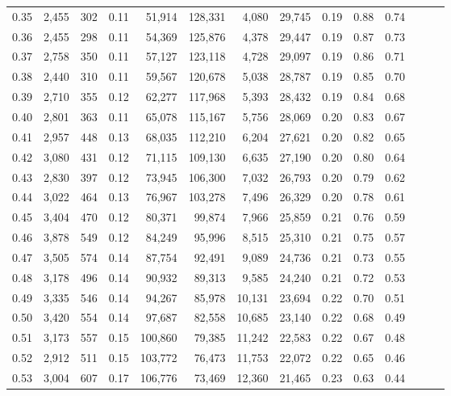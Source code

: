 \begin{tabular}{rrrrrrrrrrrrrr}
0.35 &  2,455 &  302 &  0.11 &   51,914 &  128,331 &   4,080 &  29,745 &  0.19 &  0.88 &      0.74 \\
0.36 &  2,455 &  298 &  0.11 &   54,369 &  125,876 &   4,378 &  29,447 &  0.19 &  0.87 &      0.73 \\
0.37 &  2,758 &  350 &  0.11 &   57,127 &  123,118 &   4,728 &  29,097 &  0.19 &  0.86 &      0.71 \\
0.38 &  2,440 &  310 &  0.11 &   59,567 &  120,678 &   5,038 &  28,787 &  0.19 &  0.85 &      0.70 \\
0.39 &  2,710 &  355 &  0.12 &   62,277 &  117,968 &   5,393 &  28,432 &  0.19 &  0.84 &      0.68 \\
0.40 &  2,801 &  363 &  0.11 &   65,078 &  115,167 &   5,756 &  28,069 &  0.20 &  0.83 &      0.67 \\
0.41 &  2,957 &  448 &  0.13 &   68,035 &  112,210 &   6,204 &  27,621 &  0.20 &  0.82 &      0.65 \\
0.42 &  3,080 &  431 &  0.12 &   71,115 &  109,130 &   6,635 &  27,190 &  0.20 &  0.80 &      0.64 \\
0.43 &  2,830 &  397 &  0.12 &   73,945 &  106,300 &   7,032 &  26,793 &  0.20 &  0.79 &      0.62 \\
0.44 &  3,022 &  464 &  0.13 &   76,967 &  103,278 &   7,496 &  26,329 &  0.20 &  0.78 &      0.61 \\
0.45 &  3,404 &  470 &  0.12 &   80,371 &   99,874 &   7,966 &  25,859 &  0.21 &  0.76 &      0.59 \\
0.46 &  3,878 &  549 &  0.12 &   84,249 &   95,996 &   8,515 &  25,310 &  0.21 &  0.75 &      0.57 \\
0.47 &  3,505 &  574 &  0.14 &   87,754 &   92,491 &   9,089 &  24,736 &  0.21 &  0.73 &      0.55 \\
0.48 &  3,178 &  496 &  0.14 &   90,932 &   89,313 &   9,585 &  24,240 &  0.21 &  0.72 &      0.53 \\
0.49 &  3,335 &  546 &  0.14 &   94,267 &   85,978 &  10,131 &  23,694 &  0.22 &  0.70 &      0.51 \\
0.50 &  3,420 &  554 &  0.14 &   97,687 &   82,558 &  10,685 &  23,140 &  0.22 &  0.68 &      0.49 \\
0.51 &  3,173 &  557 &  0.15 &  100,860 &   79,385 &  11,242 &  22,583 &  0.22 &  0.67 &      0.48 \\
0.52 &  2,912 &  511 &  0.15 &  103,772 &   76,473 &  11,753 &  22,072 &  0.22 &  0.65 &      0.46 \\
0.53 &  3,004 &  607 &  0.17 &  106,776 &   73,469 &  12,360 &  21,465 &  0.23 &  0.63 &      0.44 \\

\end{tabular}
